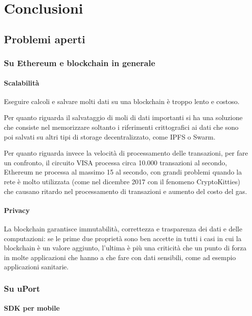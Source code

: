 \chapter{Conclusioni}

\section{Problemi aperti}

\subsection{Su Ethereum e blockchain in generale}

\subsubsection{Scalabilità}
Eseguire calcoli e salvare molti dati su una blockchain è troppo lento e costoso. 

Per quanto riguarda il salvataggio di moli di dati
importanti si ha una soluzione che consiste nel memorizzare soltanto i riferimenti crittografici
ai dati che sono poi salvati su altri tipi
di storage decentralizzato, come IPFS o Swarm.

Per quanto riguarda invece la velocità di processamento delle transazioni, per fare un confronto,
il circuito VISA processa circa 10.000 transazioni al secondo,
Ethereum ne processa al massimo 15 al secondo, con grandi problemi quando
la rete è molto utilizzata (come nel dicembre 2017 con il fenomeno CryptoKitties)
che causano ritardo nel processamento di transazioni e aumento del costo del gas.

\subsubsection{Privacy}

La blockchain garantisce immutabilità, correttezza e trasparenza dei dati e delle computazioni:
se le prime due proprietà sono ben accette in tutti i casi in cui la blockchain è un valore aggiunto,
l'ultima è più una criticità che un punto di forza in molte applicazioni
che hanno a che fare con dati sensibili, come ad esempio applicazioni sanitarie.

\subsection{Su uPort}

\subsubsection{SDK per mobile}


